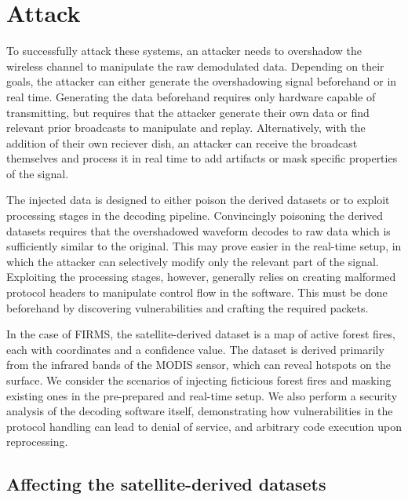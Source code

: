 \section{Attack}\label{sec:attack}

To successfully attack these systems, an attacker needs to overshadow the wireless channel to manipulate the raw demodulated data.
Depending on their goals, the attacker can either generate the overshadowing signal beforehand or in real time.
Generating the data beforehand requires only hardware capable of transmitting, but requires that the attacker generate their own data or find relevant prior broadcasts to manipulate and replay.
Alternatively, with the addition of their own reciever dish, an attacker can receive the broadcast themselves and process it in real time to add artifacts or mask specific properties of the signal.

The injected data is designed to either poison the derived datasets or to exploit processing stages in the decoding pipeline.
Convincingly poisoning the derived datasets requires that the overshadowed waveform decodes to raw data which is sufficiently similar to the original.
This may prove easier in the real-time setup, in which the attacker can selectively modify only the relevant part of the signal.
Exploiting the processing stages, however, generally relies on creating malformed protocol headers to manipulate control flow in the software.
This must be done beforehand by discovering vulnerabilities and crafting the required packets.

In the case of FIRMS, the satellite-derived dataset is a map of active forest fires, each with coordinates and a confidence value.
The dataset is derived primarily from the infrared bands of the MODIS sensor, which can reveal hotspots on the surface.
We consider the scenarios of injecting ficticious forest fires and masking existing ones in the pre-prepared and real-time setup.
We also perform a security analysis of the decoding software itself, demonstrating how vulnerabilities in the protocol handling can lead to denial of service, and arbitrary code execution upon reprocessing.

\subsection{Affecting the satellite-derived datasets}

